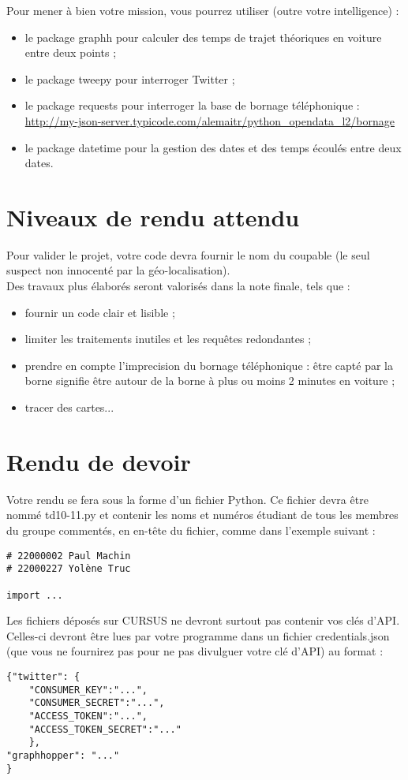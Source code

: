 \documentclass[11pt,a4paper]{article}
\begin{document}
Pour mener à bien votre mission, vous pourrez utiliser (outre votre intelligence) :
\begin{itemize}
\item le package graphh pour calculer des temps de trajet théoriques en voiture entre deux points ;
\item le package tweepy pour interroger Twitter ;
\item le package requests pour interroger la base de bornage téléphonique : \url{http://my-json-server.typicode.com/alemaitr/python_opendata_l2/bornage}
\item le package datetime pour la gestion des dates et des temps écoulés entre deux dates.
\end{itemize}


\section{Niveaux de rendu attendu}

Pour valider le projet, votre code devra fournir le nom du coupable (le seul suspect non innocenté par la géo-localisation).
\\

Des travaux plus élaborés seront valorisés dans la note finale, tels que : 
\begin{itemize}
    \item fournir un code clair et lisible ;
    \item limiter les traitements inutiles et les requêtes redondantes ;
    \item prendre en compte l'imprecision du bornage téléphonique : être capté par la borne signifie être autour de la borne à plus ou moins 2 minutes en voiture ;
    \item tracer des cartes...
\end{itemize}


\section{Rendu de devoir}
Votre rendu se fera sous la forme d’un
fichier Python. Ce fichier devra être nommé td10-11.py et contenir les noms et numéros étudiant de tous
les membres du groupe commentés, en en-tête du fichier, comme dans l’exemple suivant :
\begin{verbatim}
# 22000002 Paul Machin
# 22000227 Yolène Truc

import ...
\end{verbatim}
Les fichiers déposés sur CURSUS ne devront surtout pas contenir vos clés d’API. Celles-ci devront être lues par votre programme dans un fichier credentials.json (que vous ne fournirez pas pour ne pas divulguer votre clé d’API) au format :
\begin{verbatim}
{"twitter": {
    "CONSUMER_KEY":"...",
    "CONSUMER_SECRET":"...",
    "ACCESS_TOKEN":"...",
    "ACCESS_TOKEN_SECRET":"..."
    },
"graphhopper": "..."
}
\end{verbatim}
\end{document}
